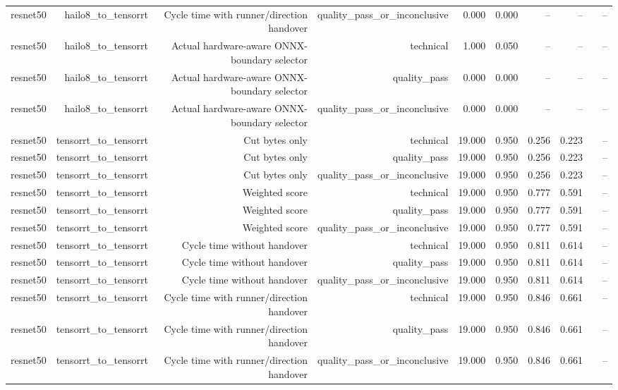 \begin{table}[t]
\begin{tabular}{lrrrrrrrrr}
resnet50 & hailo8\_to\_tensorrt & Cycle time with runner/direction handover & quality\_pass\_or\_inconclusive & 0.000 & 0.000 & -- & -- &  & -- \\
resnet50 & hailo8\_to\_tensorrt & Actual hardware-aware ONNX-boundary selector & technical & 1.000 & 0.050 & -- & -- &  & -- \\
resnet50 & hailo8\_to\_tensorrt & Actual hardware-aware ONNX-boundary selector & quality\_pass & 0.000 & 0.000 & -- & -- &  & -- \\
resnet50 & hailo8\_to\_tensorrt & Actual hardware-aware ONNX-boundary selector & quality\_pass\_or\_inconclusive & 0.000 & 0.000 & -- & -- &  & -- \\
resnet50 & tensorrt\_to\_tensorrt & Cut bytes only & technical & 19.000 & 0.950 & 0.256 & 0.223 &  & -- \\
resnet50 & tensorrt\_to\_tensorrt & Cut bytes only & quality\_pass & 19.000 & 0.950 & 0.256 & 0.223 &  & -- \\
resnet50 & tensorrt\_to\_tensorrt & Cut bytes only & quality\_pass\_or\_inconclusive & 19.000 & 0.950 & 0.256 & 0.223 &  & -- \\
resnet50 & tensorrt\_to\_tensorrt & Weighted score & technical & 19.000 & 0.950 & 0.777 & 0.591 &  & -- \\
resnet50 & tensorrt\_to\_tensorrt & Weighted score & quality\_pass & 19.000 & 0.950 & 0.777 & 0.591 &  & -- \\
resnet50 & tensorrt\_to\_tensorrt & Weighted score & quality\_pass\_or\_inconclusive & 19.000 & 0.950 & 0.777 & 0.591 &  & -- \\
resnet50 & tensorrt\_to\_tensorrt & Cycle time without handover & technical & 19.000 & 0.950 & 0.811 & 0.614 &  & -- \\
resnet50 & tensorrt\_to\_tensorrt & Cycle time without handover & quality\_pass & 19.000 & 0.950 & 0.811 & 0.614 &  & -- \\
resnet50 & tensorrt\_to\_tensorrt & Cycle time without handover & quality\_pass\_or\_inconclusive & 19.000 & 0.950 & 0.811 & 0.614 &  & -- \\
resnet50 & tensorrt\_to\_tensorrt & Cycle time with runner/direction handover & technical & 19.000 & 0.950 & 0.846 & 0.661 &  & -- \\
resnet50 & tensorrt\_to\_tensorrt & Cycle time with runner/direction handover & quality\_pass & 19.000 & 0.950 & 0.846 & 0.661 &  & -- \\
resnet50 & tensorrt\_to\_tensorrt & Cycle time with runner/direction handover & quality\_pass\_or\_inconclusive & 19.000 & 0.950 & 0.846 & 0.661 &  & -- \\

\end{tabular}
\end{table}

